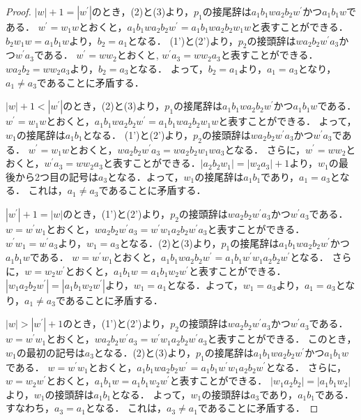 \begin{proof}
$|w|+1=|w^{\prime}|$のとき，(2)と(3)より，$p_{1}$の接尾辞は$a_{1}b_{1}wa_{2}b_{2}w^{\prime}$かつ$a_{1}b_{1}w$である．
$w^{\prime}=w_{1}w$とおくと，$a_{1}b_{1}wa_{2}b_{2}w^{\prime}=a_{1}b_{1}wa_{2}b_{2}w_{1}w$と表すことができる．
$b_{2}w_{1}w=a_{1}b_{1}w$より，$b_{2}=a_{1}$となる．
(1')と(2')より，$p_{2}$の接頭辞は$wa_{2}b_{2}w^{\prime}a_{3}$かつ$w^{\prime}a_{3}$である．
$w^{\prime}=ww_{2}$とおくと, $w^{\prime}a_{3}=ww_{2}a_{3}$と表すことができる．$wa_{2}b_{2}=ww_{2}a_{3}$より，$b_{2}=a_{3}$となる．
よって，$b_{2}=a_{1}$より，$a_{1}=a_{3}$となり，$a_{1} \ne a_{3}$であることに矛盾する．

$|w|+1 < |w^{\prime}|$のとき，(2)と(3)より，$p_{1}$の接尾辞は$a_{1}b_{1}wa_{2}b_{2}w^{\prime}$かつ$a_{1}b_{1}w$である．
$w^{\prime}=w_{1}w$とおくと，$a_{1}b_{1}wa_{2}b_{2}w^{\prime}=a_{1}b_{1}wa_{2}b_{2}w_{1}w$と表すことができる．
よって，$w_{1}$の接尾辞は$a_{1}b_{1}$となる．
(1')と(2')より，$p_{2}$の接頭辞は$wa_{2}b_{2}w^{\prime}a_{3}$かつ$w^{\prime}a_{3}$である．
$w^{\prime}=w_{1}w$とおくと，$wa_{2}b_{2}w^{\prime}a_{3}=wa_{2}b_{2}w_{1}wa_{3}$となる．
さらに，$w^{\prime}=ww_{2}$とおくと，$w^{\prime}a_{3}=ww_{2}a_{3}$と表すことができる．$|a_{2}b_{2}w_{1}|=|w_{2}a_{3}|+1$より，$w_{1}$の最後から2つ目の記号は$a_{3}$となる．よって，$w_{1}$の接尾辞は$a_{1}b_{1}$であり，$a_{1}=a_{3}$となる．
これは，$a_{1} \ne a_{3}$であることに矛盾する．

$|w^{\prime}|+1=|w|$のとき，(1')と(2')より，$p_{2}$の接頭辞は$wa_{2}b_{2}w^{\prime}a_{3}$かつ$w^{\prime}a_{3}$である．
$w=w^{\prime}w_{1}$とおくと，$wa_{2}b_{2}w^{\prime}a_{3}=w^{\prime}w_{1}a_{2}b_{2}w^{\prime}a_{3}$と表すことができる．
$w^{\prime}w_{1}=w^{\prime}a_{3}$より，$w_{1}=a_{3}$となる．(2)と(3)より，$p_{1}$の接尾辞は$a_{1}b_{1}wa_{2}b_{2}w^{\prime}$かつ$a_{1}b_{1}w$である．
$w=w^{\prime}w_{1}$とおくと，$a_{1}b_{1}wa_{2}b_{2}w^{\prime}=a_{1}b_{1}w^{\prime}w_{1}a_{2}b_{2}w^{\prime}$となる．
さらに，$w=w_{2}w^{\prime}$とおくと，$a_{1}b_{1}w=a_{1}b_{1}w_{2}w^{\prime}$と表すことができる．
$|w_{1}a_{2}b_{2}w^{\prime}|=|a_{1}b_{1}w_{2}w^{\prime}|$より，$w_{1}=a_{1}$となる．よって，$w_{1}=a_{3}$より，$a_{1}=a_{3}$となり，$a_{1} \ne a_{3}$であることに矛盾する．

$|w| > |w^{\prime}|+1$のとき，(1')と(2')より，$p_{2}$の接頭辞は$wa_{2}b_{2}w^{\prime}a_{3}$かつ$w^{\prime}a_{3}$である．
$w=w^{\prime}w_{1}$とおくと，$wa_{2}b_{2}w^{\prime}a_{3}=w^{\prime}w_{1}a_{2}b_{2}w^{\prime}a_{3}$と表すことができる．
このとき，$w_{1}$の最初の記号は$a_{3}$となる．(2)と(3)より，$p_{1}$の接尾辞は$a_{1}b_{1}wa_{2}b_{2}w^{\prime}$かつ$a_{1}b_{1}w$である．
$w=w^{\prime}w_{1}$とおくと，$a_{1}b_{1}wa_{2}b_{2}w^{\prime}=a_{1}b_{1}w^{\prime}w_{1}a_{2}b_{2}w^{\prime}$となる．
さらに，$w=w_{2}w^{\prime}$とおくと，$a_{1}b_{1}w=a_{1}b_{1}w_{2}w^{\prime}$と表すことができる．
$|w_{1}a_{2}b_{2}|=|a_{1}b_{1}w_{2}|$より，$w_{1}$の接頭辞は$a_{1}b_{1}$となる．
よって，$w_{1}$の接頭辞は$a_{3}$であり，$a_{1}b_{1}$である．
すなわち，$a_{3}=a_{1}$となる．
これは，$a_{3} \ne a_{1}$であることに矛盾する．
\smallskip


\end{proof}
